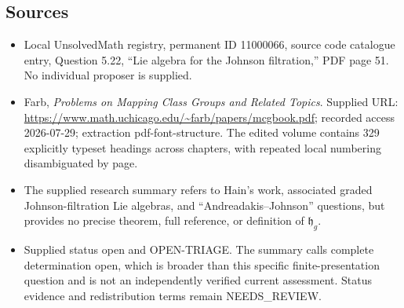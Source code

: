 \documentclass[11pt]{article}
\begin{document}
\subsection{Sources}
\begin{itemize}
\item Local UnsolvedMath registry, permanent ID 11000066, source code catalogue entry, Question 5.22, ``Lie algebra for the Johnson filtration,'' PDF page 51. No individual proposer is supplied.
\item Farb, \emph{Problems on Mapping Class Groups and Related Topics}. Supplied URL: \url{https://www.math.uchicago.edu/~farb/papers/mcgbook.pdf}; recorded access 2026-07-29; extraction pdf-font-structure. The edited volume contains 329 explicitly typeset headings across chapters, with repeated local numbering disambiguated by page.
\item The supplied research summary refers to Hain's work, associated graded Johnson-filtration Lie algebras, and ``Andreadakis--Johnson'' questions, but provides no precise theorem, full reference, or definition of \(\mathfrak h_g\).
\item Supplied status open and OPEN-TRIAGE. The summary calls complete determination open, which is broader than this specific finite-presentation question and is not an independently verified current assessment. Status evidence and redistribution terms remain NEEDS\_REVIEW.
\end{itemize}
\end{document}
